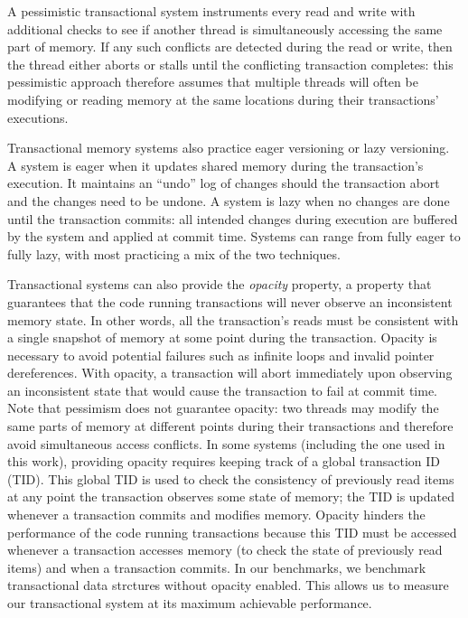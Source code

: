 A pessimistic transactional system instruments every read and write with additional checks to see if another thread is simultaneously accessing the same part of memory. If any such conflicts are detected during the read or write, then the thread either aborts or stalls until the conflicting transaction completes: this pessimistic approach therefore assumes that multiple threads will often be modifying or reading memory at the same locations during their transactions' executions. 

Transactional memory systems also practice eager versioning or lazy versioning. A system is eager when it updates shared memory during the transaction's execution. It maintains an ``undo'' log of changes should the transaction abort and the changes need to be undone. A system is lazy when no changes are done until the transaction commits: all intended changes during execution are buffered by the system and applied at commit time. Systems can range from fully eager to fully lazy, with most practicing a mix of the two techniques.

Transactional systems can also provide the \emph{opacity} property\cite{opacity}, a property that guarantees that the code running transactions will never observe an inconsistent memory state. 
In other words, all the transaction's reads must be consistent with a single snapshot of memory at some point during the transaction.
Opacity is necessary to avoid potential failures such as infinite loops and invalid pointer dereferences. With opacity, a transaction will abort immediately upon observing an inconsistent state that would cause the transaction to fail at commit time. Note that pessimism does not guarantee opacity: two threads may modify the same parts of memory at different points during their transactions and therefore avoid simultaneous access conflicts.
In some systems (including the one used in this work), providing opacity requires keeping track of a global transaction ID (TID). This global TID is used to check the consistency of previously read items at any point the transaction observes some state of memory; the TID is updated whenever a transaction commits and modifies memory. Opacity hinders the performance of the code running transactions because this TID must be accessed whenever a transaction accesses memory (to check the state of previously read items) and when a transaction commits. In our benchmarks, we benchmark transactional data strctures without opacity enabled. This allows us to measure our transactional system at its maximum achievable performance.

